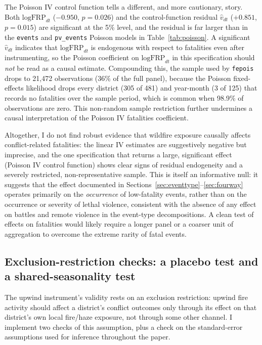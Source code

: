 \documentclass[12pt]{article}
\begin{document}
The Poisson IV control function tells a different, and more cautionary, story. Both $\text{logFRP}_{dt}$ ($-0.950$, $p=0.026$) and the control-function residual $\hat{v}_{dt}$ ($+0.851$, $p=0.015$) are significant at the 5\% level, and the residual is far larger than in the \texttt{events} and \texttt{pv\_events} Poisson models in Table~\ref{tab:poisson}. A significant $\hat{v}_{dt}$ indicates that $\text{logFRP}_{dt}$ is endogenous with respect to fatalities even after instrumenting, so the Poisson coefficient on $\text{logFRP}_{dt}$ in this specification should \emph{not} be read as a causal estimate. Compounding this, the sample used by \texttt{fepois} drops to 21{,}472 observations (36\% of the full panel), because the Poisson fixed-effects likelihood drops every district (305 of 481) and year-month (3 of 125) that records no fatalities over the sample period, which is common when 98.9\% of observations are zero. This non-random sample restriction further undermines a causal interpretation of the Poisson IV fatalities coefficient.

Altogether, I do not find robust evidence that wildfire exposure causally affects conflict-related fatalities: the linear IV estimates are suggestively negative but imprecise, and the one specification that returns a large, significant effect (Poisson IV control function) shows clear signs of residual endogeneity and a severely restricted, non-representative sample. This is itself an informative null: it suggests that the effect documented in Sections~\ref{sec:eventtype}--\ref{sec:fourway} operates primarily on the \emph{occurrence} of low-fatality events, rather than on the occurrence or severity of lethal violence, consistent with the absence of any effect on battles and remote violence in the event-type decompositions. A clean test of effects on fatalities would likely require a longer panel or a coarser unit of aggregation to overcome the extreme rarity of fatal events.

\subsection{Exclusion-restriction checks: a placebo test and a shared-seasonality test}
\label{sec:robustness}

The upwind instrument's validity rests on an exclusion restriction: upwind fire activity should affect a district's conflict outcomes only through its effect on that district's own local fire/haze exposure, not through some other channel. I implement two checks of this assumption, plus a check on the standard-error assumptions used for inference throughout the paper.
\end{document}
